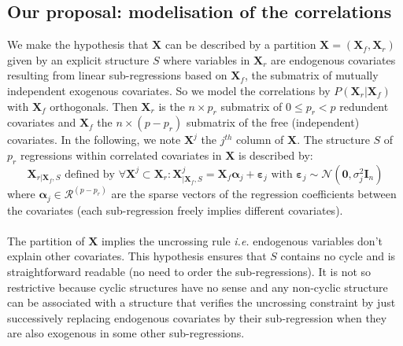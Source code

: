 \documentclass[11pt,a4paper]{article}
\begin{document}
\subsection{Our proposal: modelisation of the correlations}
We make the hypothesis that $\boldsymbol{X}$ can be described by a partition $\boldsymbol{X}=(\boldsymbol{X}_f,\boldsymbol{X}_r) $ given by an explicit structure $S$ where variables in $\boldsymbol{X}_r$ are endogenous covariates resulting from linear sub-regressions based on $\boldsymbol{X}_f$, the submatrix of mutually independent exogenous covariates.
So we model the correlations by $P(\boldsymbol{X}_r|\boldsymbol{X}_f) $ with $\boldsymbol{X}_f$ orthogonals.
 Then $\boldsymbol{X}_r$ is the $n\times p_r$ submatrix of $0\leq p_r <p$ redundent covariates and $\boldsymbol{X}_f$ the $n\times (p-p_r)$ submatrix of the free (independent) covariates.
In the following, we note $\boldsymbol{X}^j$ the $j^{th}$ column of $\boldsymbol{X}$.
The structure $S$ of $p_r$ regressions within correlated covariates in $\boldsymbol{X}$ is described by:
	\begin{equation}
		\boldsymbol{X}_{r|\boldsymbol{X}_f,S} \textrm{ defined by }\forall \boldsymbol{X}^j \subset \boldsymbol{X}_r: \boldsymbol{X}^j_{|\boldsymbol{X}_f,S}=\boldsymbol{X}_f\boldsymbol{\alpha}_j+\boldsymbol{\varepsilon}_j \textrm{ with } \boldsymbol{\varepsilon}_j \sim\mathcal{N}(\boldsymbol{0},\sigma^2_j\boldsymbol{I}_n) \label{SR}
	\end{equation}
		where $\boldsymbol{\alpha}_j \in \mathcal{R}^{(p-p_r)}$ are the sparse vectors of the regression coefficients between the covariates (each sub-regression freely implies different covariates). 
\\
\\


The partition of $\boldsymbol{X}$ implies the uncrossing rule %
{\it i.e.} endogenous variables don't explain other covariates. This hypothesis ensures that $S$ contains no cycle and is straightforward readable (no need to order the sub-regressions). It is not so restrictive because cyclic structures have no sense and any non-cyclic structure can be associated with a structure that verifies the uncrossing constraint by just successively replacing endogenous covariates by their sub-regression when they are also exogenous in some other sub-regressions.


\end{document}
